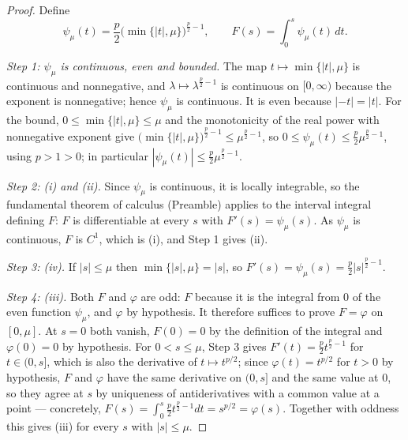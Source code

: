 \begin{proof}
Define
\[
\psi_\mu(t)=\frac p2\bigl(\min\{|t|,\mu\}\bigr)^{\frac p2-1},
\qquad
F(s)=\int_0^s\psi_\mu(t)\,dt .
\]

\emph{Step 1: $\psi_\mu$ is continuous, even and bounded.}  The map
$t\mapsto\min\{|t|,\mu\}$ is continuous and nonnegative, and
$\lambda\mapsto\lambda^{\frac p2-1}$ is continuous on $[0,\infty)$ because the
exponent is nonnegative; hence $\psi_\mu$ is continuous.  It is even because
$|-t|=|t|$.  For the bound, $0\le\min\{|t|,\mu\}\le\mu$ and the monotonicity of
the real power with nonnegative exponent give
$\bigl(\min\{|t|,\mu\}\bigr)^{\frac p2-1}\le\mu^{\frac p2-1}$, so
$0\le\psi_\mu(t)\le\frac p2\mu^{\frac p2-1}$, using $p>1>0$; in particular
$|\psi_\mu(t)|\le\frac p2\mu^{\frac p2-1}$.

\emph{Step 2: (i) and (ii).}  Since $\psi_\mu$ is continuous, it is locally
integrable, so the fundamental theorem of calculus (Preamble) applies to the
interval integral defining $F$: $F$ is differentiable at every $s$ with
$F'(s)=\psi_\mu(s)$.  As $\psi_\mu$ is continuous, $F$ is $C^1$, which is (i),
and Step 1 gives (ii).

\emph{Step 3: (iv).}  If $|s|\le\mu$ then $\min\{|s|,\mu\}=|s|$, so
$F'(s)=\psi_\mu(s)=\frac p2|s|^{\frac p2-1}$.

\emph{Step 4: (iii).}  Both $F$ and $\varphi$ are odd: $F$ because it is the
integral from $0$ of the even function $\psi_\mu$, and $\varphi$ by hypothesis.
It therefore suffices to prove $F=\varphi$ on $[0,\mu]$.  At $s=0$ both vanish,
$F(0)=0$ by the definition of the integral and $\varphi(0)=0$ by hypothesis.
For $0<s\le\mu$, Step 3 gives $F'(t)=\frac p2t^{\frac p2-1}$ for
$t\in(0,s]$, which is also the derivative of $t\mapsto t^{p/2}$; since
$\varphi(t)=t^{p/2}$ for $t>0$ by hypothesis, $F$ and $\varphi$ have the same
derivative on $(0,s]$ and the same value at $0$, so they agree at $s$ by
uniqueness of antiderivatives with a common value at a point --- concretely,
$F(s)=\int_0^s\frac p2t^{\frac p2-1}dt=s^{p/2}=\varphi(s)$.  Together with
oddness this gives (iii) for every $s$ with $|s|\le\mu$.
\end{proof}
